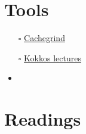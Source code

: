 \documentclass[openany, a4paper]{book}
\theoremstyle{break}
\theoremstyle{example}
\theoremstyle{note}
\theoremstyle{break}
\theoremstyle{exercise}
\begin{document}
\chapter{Tools}
\label{sec:orgc86845a}

\begin{itemize}
\item[{$\square$}] \href{https://valgrind.org/docs/manual/cg-manual.html}{Cachegrind}
\item[{$\square$}] \href{https://github.com/kokkos/kokkos-tutorials/wiki/Kokkos-Lecture-Series}{Kokkos lectures}
\item
\end{itemize}


\chapter{Readings}
\label{sec:org1ac83fd}
\end{document}
